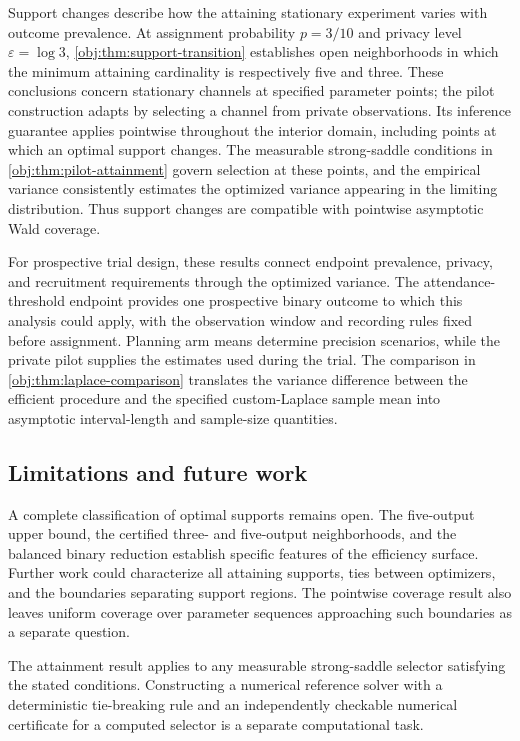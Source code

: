 Support changes describe how the attaining stationary experiment varies with outcome prevalence. At assignment probability \(p=3/10\) and privacy level \(\varepsilon=\log 3\), \cref{obj:thm:support-transition} establishes open neighborhoods in which the minimum attaining cardinality is respectively five and three. These conclusions concern stationary channels at specified parameter points; the pilot construction adapts by selecting a channel from private observations. Its inference guarantee applies pointwise throughout the interior domain, including points at which an optimal support changes. The measurable strong-saddle conditions in \cref{obj:thm:pilot-attainment} govern selection at these points, and the empirical variance consistently estimates the optimized variance appearing in the limiting distribution. Thus support changes are compatible with pointwise asymptotic Wald coverage.

For prospective trial design, these results connect endpoint prevalence, privacy, and recruitment requirements through the optimized variance. The attendance-threshold endpoint provides one prospective binary outcome to which this analysis could apply, with the observation window and recording rules fixed before assignment. Planning arm means determine precision scenarios, while the private pilot supplies the estimates used during the trial. The comparison in \cref{obj:thm:laplace-comparison} translates the variance difference between the efficient procedure and the specified custom-Laplace sample mean into asymptotic interval-length and sample-size quantities.

\subsection{Limitations and future work}

A complete classification of optimal supports remains open. The five-output upper bound, the certified three- and five-output neighborhoods, and the balanced binary reduction establish specific features of the efficiency surface. Further work could characterize all attaining supports, ties between optimizers, and the boundaries separating support regions. The pointwise coverage result also leaves uniform coverage over parameter sequences approaching such boundaries as a separate question.

The attainment result applies to any measurable strong-saddle selector satisfying the stated conditions. Constructing a numerical reference solver with a deterministic tie-breaking rule and an independently checkable numerical certificate for a computed selector is a separate computational task.

